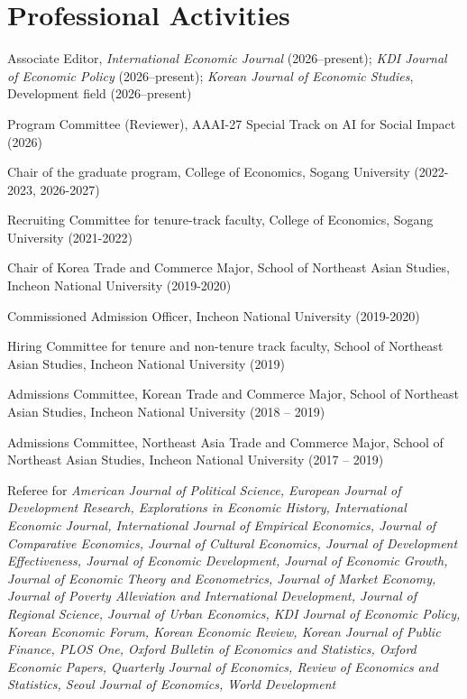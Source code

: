 \documentclass[a4paper,12pt]{article}
\renewenvironment{itemize}{
  \begin{list}{}{
    \setlength{\leftmargin}{1.5em}
  }
}{
  \end{list}
}
\begin{document}
\section*{Professional Activities}
\begin{itemize}

	\item Associate Editor, \textit{International Economic Journal} (2026--present); \textit{KDI Journal of Economic Policy} (2026--present); \textit{Korean Journal of Economic Studies}, Development field (2026--present)
	\item Program Committee (Reviewer), AAAI-27 Special Track on AI for Social Impact (2026)
	\item Chair of the graduate program, College of Economics, Sogang University (2022-2023, 2026-2027)
	\item Recruiting Committee for tenure-track faculty, College of Economics, Sogang University (2021-2022)
	\item Chair of Korea Trade and Commerce Major, School of Northeast Asian Studies, Incheon National University (2019-2020)
	\item Commissioned Admission Officer, Incheon National University (2019-2020)
	\item Hiring Committee for tenure and non-tenure track faculty, School of Northeast Asian Studies, Incheon National University (2019)
	\item Admissions Committee, Korean Trade and Commerce Major, School of Northeast Asian Studies, Incheon National University (2018 -- 2019)
	\item Admissions Committee, Northeast Asia Trade and Commerce Major, School of Northeast Asian Studies, Incheon National University (2017 -- 2019)
	\item Referee for \textit{American Journal of Political Science, European Journal of Development Research, Explorations in Economic History, International Economic Journal, International Journal of Empirical Economics, Journal of Comparative Economics, Journal of Cultural Economics, Journal of Development Effectiveness, Journal of Economic Development, Journal of Economic Growth, Journal of Economic Theory and Econometrics, Journal of Market Economy, Journal of Poverty Alleviation and International Development, Journal of Regional Science, Journal of Urban Economics, KDI Journal of Economic Policy, Korean Economic Forum, Korean Economic Review, Korean Journal of Public Finance, PLOS One, Oxford Bulletin of Economics and Statistics, Oxford Economic Papers, Quarterly Journal of Economics, Review of Economics and Statistics, Seoul Journal of Economics, World Development}
\end{itemize}
\end{document}
